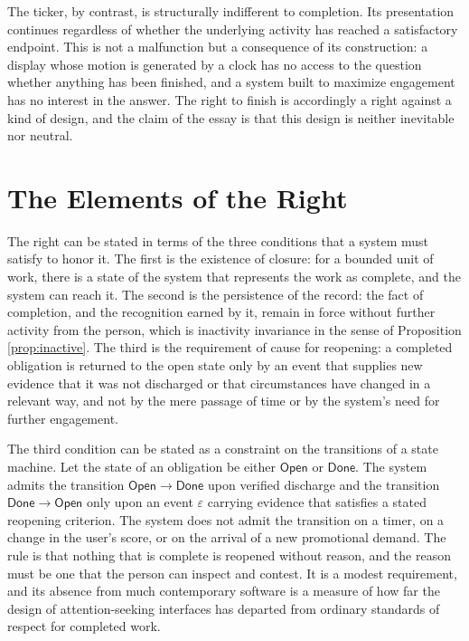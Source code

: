 \documentclass[11pt]{report}
\theoremstyle{definition}
\theoremstyle{remark}
\begin{document}
The ticker, by contrast, is structurally indifferent to completion. Its presentation continues regardless of whether the underlying activity has reached a satisfactory endpoint. This is not a malfunction but a consequence of its construction: a display whose motion is generated by a clock has no access to the question whether anything has been finished, and a system built to maximize engagement has no interest in the answer. The right to finish is accordingly a right against a kind of design, and the claim of the essay is that this design is neither inevitable nor neutral.

\section{The Elements of the Right}

The right can be stated in terms of the three conditions that a system must satisfy to honor it. The first is the existence of closure: for a bounded unit of work, there is a state of the system that represents the work as complete, and the system can reach it. The second is the persistence of the record: the fact of completion, and the recognition earned by it, remain in force without further activity from the person, which is inactivity invariance in the sense of Proposition \ref{prop:inactive}. The third is the requirement of cause for reopening: a completed obligation is returned to the open state only by an event that supplies new evidence that it was not discharged or that circumstances have changed in a relevant way, and not by the mere passage of time or by the system's need for further engagement.

The third condition can be stated as a constraint on the transitions of a state machine. Let the state of an obligation be either $\mathsf{Open}$ or $\mathsf{Done}$. The system admits the transition $\mathsf{Open}\to\mathsf{Done}$ upon verified discharge and the transition $\mathsf{Done}\to\mathsf{Open}$ only upon an event $\varepsilon$ carrying evidence that satisfies a stated reopening criterion. The system does not admit the transition on a timer, on a change in the user's score, or on the arrival of a new promotional demand. The rule is that nothing that is complete is reopened without reason, and the reason must be one that the person can inspect and contest. It is a modest requirement, and its absence from much contemporary software is a measure of how far the design of attention-seeking interfaces has departed from ordinary standards of respect for completed work.
\end{document}
